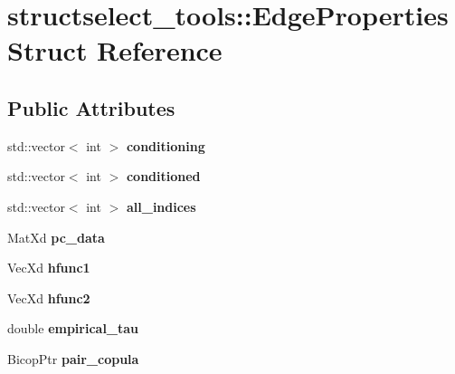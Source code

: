 \hypertarget{structstructselect__tools_1_1_edge_properties}{\section{structselect\+\_\+tools\+:\+:Edge\+Properties Struct Reference}
\label{structstructselect__tools_1_1_edge_properties}
}
\subsection*{Public Attributes}
\begin{DoxyCompactItemize}
\item 
\hypertarget{structstructselect__tools_1_1_edge_properties_a9f1c09d462b487e2cb45bbe6fa2f6368}{std\+::vector$<$ int $>$ {\bfseries conditioning}}\label{structstructselect__tools_1_1_edge_properties_a9f1c09d462b487e2cb45bbe6fa2f6368}

\item 
\hypertarget{structstructselect__tools_1_1_edge_properties_a1b0d50e8466ddc845c726a50ae16ebea}{std\+::vector$<$ int $>$ {\bfseries conditioned}}\label{structstructselect__tools_1_1_edge_properties_a1b0d50e8466ddc845c726a50ae16ebea}

\item 
\hypertarget{structstructselect__tools_1_1_edge_properties_a702ffe89a46787f06659890db25a0611}{std\+::vector$<$ int $>$ {\bfseries all\+\_\+indices}}\label{structstructselect__tools_1_1_edge_properties_a702ffe89a46787f06659890db25a0611}

\item 
\hypertarget{structstructselect__tools_1_1_edge_properties_a65df14de91b2be8d9a1492791e6b65bc}{Mat\+Xd {\bfseries pc\+\_\+data}}\label{structstructselect__tools_1_1_edge_properties_a65df14de91b2be8d9a1492791e6b65bc}

\item 
\hypertarget{structstructselect__tools_1_1_edge_properties_adc800b6e2bb72a0a68b4675a7daeda96}{Vec\+Xd {\bfseries hfunc1}}\label{structstructselect__tools_1_1_edge_properties_adc800b6e2bb72a0a68b4675a7daeda96}

\item 
\hypertarget{structstructselect__tools_1_1_edge_properties_a951d87593c49216772be6f5a6f7baf9c}{Vec\+Xd {\bfseries hfunc2}}\label{structstructselect__tools_1_1_edge_properties_a951d87593c49216772be6f5a6f7baf9c}

\item 
\hypertarget{structstructselect__tools_1_1_edge_properties_a24eb86105437d0a61b63dbe26d08d579}{double {\bfseries empirical\+\_\+tau}}\label{structstructselect__tools_1_1_edge_properties_a24eb86105437d0a61b63dbe26d08d579}

\item 
\hypertarget{structstructselect__tools_1_1_edge_properties_a6bfce8ceccc789baad98184646a40c17}{Bicop\+Ptr {\bfseries pair\+\_\+copula}}\label{structstructselect__tools_1_1_edge_properties_a6bfce8ceccc789baad98184646a40c17}

\end{DoxyCompactItemize}
